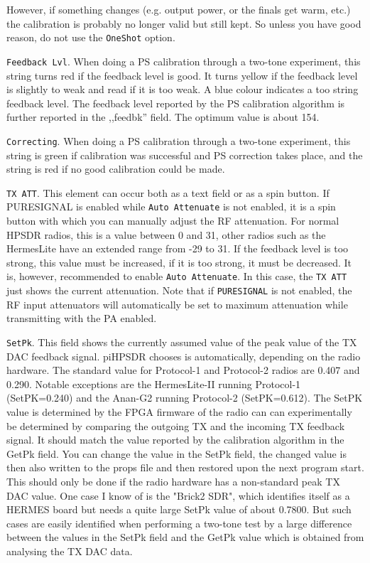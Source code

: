 \documentclass[12pt]{book}
\def\rett#1{\texttt{\color{red}#1}}
\def\pH{pi\-HPSDR\xspace}
\begin{document}
However, if something changes (e.g. output power, or the finals get warm, etc.) the
calibration is probably no longer valid but still kept. So unless you have good reason,
do not use the \rett{OneShot} option.


\rett{Feedback Lvl}. When doing a PS calibration through a two-tone experiment, this string
turns red if the feedback level is good. It turns yellow if the feedback level is slightly
to weak and read if it is too weak. A blue colour indicates a too string feedback level.
The feedback level reported by the PS calibration algorithm is further reported in the
,,feedbk'' field. The optimum value is about 154.

\rett{Correcting}. When doing a PS calibration through a two-tone experiment, this string
is green if calibration was successful and PS correction takes place, and the string is
red if no good calibration could be made.

\rett{TX ATT}. This element can occur both as a text field or as a spin button.
If PURESIGNAL is enabled while \rett{Auto Attenuate} is not enabled, it is a spin button with which
you can manually adjust the RF attenuation. For normal HPSDR radios, this is a value
between 0 and 31, other radios such as the HermesLite have an extended range from
-29 to 31. If the feedback level is too strong, this value must be increased, if it
is too strong, it must be decreased. It is, however, recommended to enable \rett{Auto Attenuate}.
In this case, the \rett{TX ATT} just shows the current attenuation.
Note that if \texttt{PURESIGNAL} is not enabled, the RF input attenuators
will automatically be set to maximum attenuation while transmitting with the PA enabled.

\rett{SetPk}. This field shows the currently assumed value of the peak value of the TX DAC
feedback signal. \pH chooses is automatically, depending on the radio hardware.
The standard value for Protocol-1 and Protocol-2 radios are 0.407 and 0.290. Notable exceptions are
the HermesLite-II running Protocol-1 (SetPK=0.240) and the Anan-G2 running Protocol-2 (SetPK=0.612).
The SetPK value is determined by the FPGA firmware of the radio can can experimentally
be determined by comparing the outgoing TX and the incoming TX feedback signal.
It should match the value reported
by the calibration algorithm in the GetPk field. You can change the value in the SetPk
field, the changed value is then also written to the props file and then restored
upon the next program start. This should only be done if the radio hardware has
a non-standard peak TX DAC value. One case I  know of is the "Brick2 SDR", which identifies
itself as a HERMES board but needs a quite large SetPk value of about 0.7800. But such
cases are easily identified when performing a two-tone test by a large difference
between the values in the SetPk field and the GetPk value which is obtained from analysing
the TX DAC data.
\end{document}
